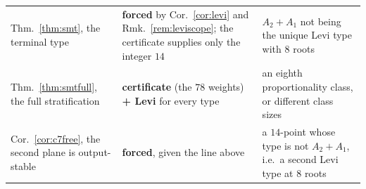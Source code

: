 \documentclass[11pt,reqno]{amsart}
\theoremstyle{plain}
\theoremstyle{definition}
\theoremstyle{remark}
\begin{document}
\begin{table}[h]
\begin{tabular}{@{}p{}p{}p{}@{}}
Thm.~\ref{thm:smt}, the terminal type
 & \textbf{forced} by Cor.~\ref{cor:levi} and Rmk.~\ref{rem:leviscope}; the
   certificate supplies only the integer $14$
 & $A_2{+}A_1$ not being the unique Levi type with $8$ roots\\
Thm.~\ref{thm:smtfull}, the full stratification
 & \textbf{certificate} (the $78$ weights) \textbf{+ Levi} for every type
 & an eighth proportionality class, or different class sizes\\
Cor.~\ref{cor:c7free}, the second plane is output-stable
 & \textbf{forced}, given the line above
 & a $14$-point whose type is not $A_2{+}A_1$, i.e.\ a second Levi type at $8$ roots\\

\bottomrule
\end{tabular}
\end{table}
\end{document}
